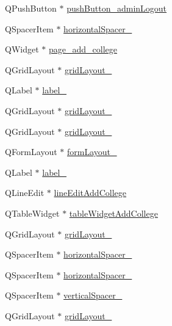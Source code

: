 \begin{DoxyCompactItemize}
\item 
Q\+Push\+Button $\ast$ \hyperlink{class_ui___main_window_a9323e5c5ce827ee628b35b5929dfe8dd}{push\+Button\+\_\+admin\+Logout}
\item 
Q\+Spacer\+Item $\ast$ \hyperlink{class_ui___main_window_a172cf968930f578fca5cf3eec4e3ee39}{horizontal\+Spacer\+\_}
\item 
Q\+Widget $\ast$ \hyperlink{class_ui___main_window_a95d243321f36a07179b7768076dc9b34}{page\+\_\+add\+\_\+college}
\item 
Q\+Grid\+Layout $\ast$ \hyperlink{class_ui___main_window_a4fc0865a2fea446b284d1db5fc111211}{grid\+Layout\+\_}
\item 
Q\+Label $\ast$ \hyperlink{class_ui___main_window_a1bf8f5e6531b7bc79378d58ee57ba389}{label\+\_}
\item 
Q\+Grid\+Layout $\ast$ \hyperlink{class_ui___main_window_a2bb984d720e889f05d38dac3cf7949c9}{grid\+Layout\+\_}
\item 
Q\+Grid\+Layout $\ast$ \hyperlink{class_ui___main_window_a63157bad53e80af9d929e38b532867a0}{grid\+Layout\+\_}
\item 
Q\+Form\+Layout $\ast$ \hyperlink{class_ui___main_window_a46a30aae6af8aa259c58a2687e0706e9}{form\+Layout\+\_}
\item 
Q\+Label $\ast$ \hyperlink{class_ui___main_window_a438102703ff7e65b133ba3760663d554}{label\+\_}
\item 
Q\+Line\+Edit $\ast$ \hyperlink{class_ui___main_window_a43387c22ac74c1296c232c2b6b6af86e}{line\+Edit\+Add\+College}
\item 
Q\+Table\+Widget $\ast$ \hyperlink{class_ui___main_window_a774c713467353cccd282df59a7e867a2}{table\+Widget\+Add\+College}
\item 
Q\+Grid\+Layout $\ast$ \hyperlink{class_ui___main_window_aed885e9b4e8efc6da855c44aa087922e}{grid\+Layout\+\_}
\item 
Q\+Spacer\+Item $\ast$ \hyperlink{class_ui___main_window_a8a4d45e18c8a38b707ffb6d9eaffc677}{horizontal\+Spacer\+\_}
\item 
Q\+Spacer\+Item $\ast$ \hyperlink{class_ui___main_window_a63d9221a2b34983ef09ee78ea77a20b7}{horizontal\+Spacer\+\_}
\item 
Q\+Spacer\+Item $\ast$ \hyperlink{class_ui___main_window_ab50f875dd2d93ea3b90bde8aafca017a}{vertical\+Spacer\+\_}
\item 
Q\+Grid\+Layout $\ast$ \hyperlink{class_ui___main_window_a1f91d05a063890efd359caac0338c7b0}{grid\+Layout\+\_}
\item 

\end{DoxyCompactItemize}
